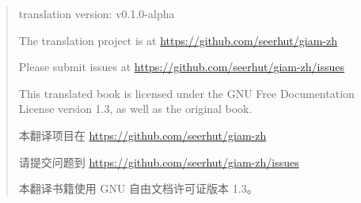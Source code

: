 \rule{0pt}{0pt}

\vfill

\begin{quote}
    translation version: v0.1.0-alpha

    The translation project is at \newline\url{https://github.com/seerhut/giam-zh} 

    Please submit issues at \newline\url{https://github.com/seerhut/giam-zh/issues}

    This translated book is licensed under the GNU Free Documentation License version 1.3, as well as the original book.

    本翻译项目在 \url{https://github.com/seerhut/giam-zh}

    请提交问题到 \url{https://github.com/seerhut/giam-zh/issues}

    本翻译书籍使用 GNU 自由文档许可证版本 1.3。
\end{quote}




\vfill